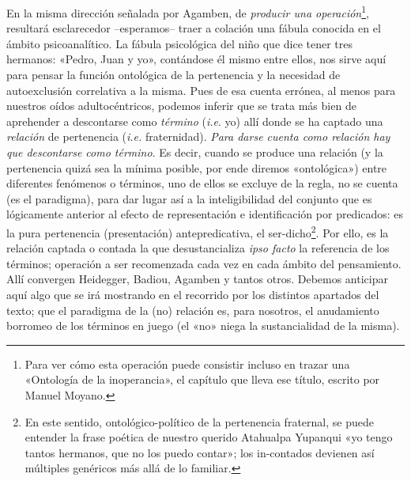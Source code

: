 En la misma dirección señalada por Agamben, de \emph{producir una operación}\footnote{Para ver cómo esta operación puede consistir incluso en trazar una «Ontología de la inoperancia», el capítulo que lleva ese título, escrito por Manuel Moyano.}, resultará esclarecedor --esperamos-- traer a colación una fábula conocida en el ámbito psicoanalítico. La fábula psicológica del niño que dice tener tres hermanos: «Pedro, Juan y yo», contándose él mismo entre ellos, nos sirve aquí para pensar la función ontológica de la pertenencia y la necesidad de autoexclusión correlativa a la misma. Pues de esa cuenta errónea, al menos para nuestros oídos adultocéntricos, podemos inferir que se trata más bien de aprehender a descontarse como \emph{término} (\emph{i.e}. yo) allí donde se ha captado una \emph{relación} de pertenencia (\emph{i.e.} fraternidad). \emph{Para darse cuenta como relación hay que descontarse como término}. Es decir, cuando se produce una relación (y la pertenencia quizá sea la mínima posible, por ende diremos «ontológica») entre diferentes fenómenos o términos, uno de ellos se excluye de la regla, no se cuenta (es el paradigma), para dar lugar así a la inteligibilidad del conjunto que es lógicamente anterior al efecto de representación e identificación por predicados: es la pura pertenencia (presentación) antepredicativa, el ser-dicho\footnote{En este sentido, ontológico-político de la pertenencia fraternal, se puede entender la frase poética de nuestro querido Atahualpa Yupanqui «yo tengo tantos hermanos, que no los puedo contar»; los in-contados devienen así múltiples genéricos más allá de lo familiar.}. Por ello, es la relación captada o contada la que desustancializa \emph{ipso facto} la referencia de los términos; operación a ser recomenzada cada vez en cada ámbito del pensamiento. Allí convergen Heidegger, Badiou, Agamben y tantos otros. Debemos anticipar aquí algo que se irá mostrando en el recorrido por los distintos apartados del texto; que el paradigma de la (no) relación es, para nosotros, el anudamiento borromeo de los términos en juego (el «no» niega la sustancialidad de la misma).

